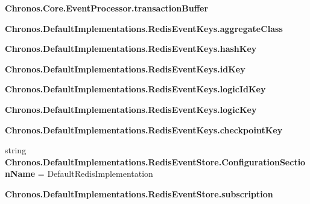 \begin{DoxyCompactItemize}
\item 
{\bfseries Chronos.\+Core.\+Event\+Processor.\+transaction\+Buffer}\hypertarget{group__Chronos_ga187adadba7f66774b4f67f2b989f930f}{}\label{group__Chronos_ga187adadba7f66774b4f67f2b989f930f}

\item 
{\bfseries Chronos.\+Default\+Implementations.\+Redis\+Event\+Keys.\+aggregate\+Class}\hypertarget{group__Chronos_ga4ebdc1d4195cafeeb47f033eb5dc9443}{}\label{group__Chronos_ga4ebdc1d4195cafeeb47f033eb5dc9443}

\item 
{\bfseries Chronos.\+Default\+Implementations.\+Redis\+Event\+Keys.\+hash\+Key}\hypertarget{group__Chronos_ga6fdb8823c20384d880a3ca5c9faa8f05}{}\label{group__Chronos_ga6fdb8823c20384d880a3ca5c9faa8f05}

\item 
{\bfseries Chronos.\+Default\+Implementations.\+Redis\+Event\+Keys.\+id\+Key}\hypertarget{group__Chronos_gaef5df112e52ad53ce67328b636f34c13}{}\label{group__Chronos_gaef5df112e52ad53ce67328b636f34c13}

\item 
{\bfseries Chronos.\+Default\+Implementations.\+Redis\+Event\+Keys.\+logic\+Id\+Key}\hypertarget{group__Chronos_gab0501e553117630ec4ef79e9e1c4a692}{}\label{group__Chronos_gab0501e553117630ec4ef79e9e1c4a692}

\item 
{\bfseries Chronos.\+Default\+Implementations.\+Redis\+Event\+Keys.\+logic\+Key}\hypertarget{group__Chronos_ga56123e48525b4fa08e5bd2468c204298}{}\label{group__Chronos_ga56123e48525b4fa08e5bd2468c204298}

\item 
{\bfseries Chronos.\+Default\+Implementations.\+Redis\+Event\+Keys.\+checkpoint\+Key}\hypertarget{group__Chronos_ga20bb7e89d808e14b6e680d839f63c30c}{}\label{group__Chronos_ga20bb7e89d808e14b6e680d839f63c30c}

\item 
string {\bfseries Chronos.\+Default\+Implementations.\+Redis\+Event\+Store.\+Configuration\+Section\+Name} = \textquotesingle{}Default\+Redis\+Implementation\textquotesingle{}\hypertarget{group__Chronos_gadcf5455525aac2aeefb7b232564628be}{}\label{group__Chronos_gadcf5455525aac2aeefb7b232564628be}

\item 
{\bfseries Chronos.\+Default\+Implementations.\+Redis\+Event\+Store.\+subscription}\hypertarget{group__Chronos_ga0b48416f9e9aec25e7e148789529131a}{}\label{group__Chronos_ga0b48416f9e9aec25e7e148789529131a}


\end{DoxyCompactItemize}
